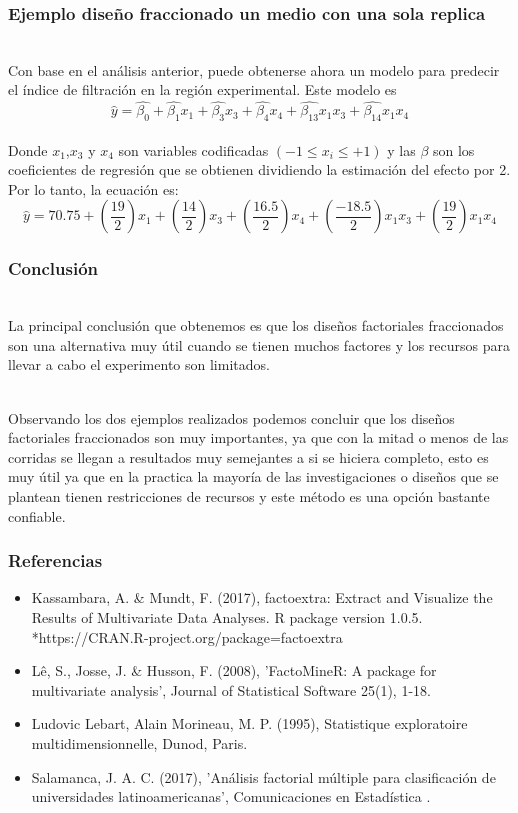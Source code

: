 \documentclass[12pt]{beamer}
\begin{document}
\begin{frame}
\frametitle{Ejemplo diseño fraccionado un medio con una sola replica}
~\\Con base en el análisis anterior, puede obtenerse ahora un modelo para predecir el índice de filtración en la región experimental. Este modelo es
$$\hat{y}=\hat{\beta_0}+\hat{\beta_1}x_1+\hat{\beta_3}x_3+\hat{\beta_4}x_4+\hat{\beta_{13}}x_1x_3+\hat{\beta_{14}}x_1x_4$$
~\\Donde $x_1$,$x_3$ y $x_4$ son variables codificadas $(-1\leq x_i\leq +1)$ y las $\beta$ son los coeficientes de regresión que se obtienen dividiendo la estimación del efecto por 2. Por lo tanto, la ecuación es:
$$\hat{y}=70.75+\left(\frac{19}{2}\right)x_1+\left(\frac{14}{2}\right)x_3+\left(\frac{16.5}{2}\right)x_4+\left(\frac{-18.5}{2}\right)x_1x_3+\left(\frac{19}{2}\right)x_1x_4$$

\end{frame}

\begin{frame}
\frametitle{Conclusión}
~\\La principal conclusión que obtenemos es que los diseños factoriales fraccionados son una alternativa muy útil cuando se tienen muchos factores y los recursos para llevar a cabo el experimento son limitados.

~\\ Observando los dos ejemplos realizados podemos concluir que los diseños factoriales fraccionados son muy importantes, ya que con la mitad o menos de las corridas se llegan a resultados muy semejantes a si se hiciera completo, esto es muy útil ya que en la practica la mayoría de las investigaciones o diseños que se plantean tienen restricciones de recursos y este método es una opción bastante confiable.


\end{frame}




\begin{frame}
\frametitle{Referencias}
\begin{itemize}
\item Kassambara, A. \& Mundt, F. (2017), factoextra: Extract and Visualize the Results of Multivariate
Data Analyses. R package version 1.0.5.
*https://CRAN.R-project.org/package=factoextra


\item Lê, S., Josse, J. \& Husson, F. (2008), 'FactoMineR: A package for multivariate analysis', Journal
of Statistical Software 25(1), 1-18.


\item Ludovic Lebart, Alain Morineau, M. P. (1995), Statistique exploratoire multidimensionnelle, Dunod,
Paris.

\item Salamanca, J. A. C. (2017), 'Análisis factorial múltiple para clasificación de universidades latinoamericanas', Comunicaciones en Estadística .
\end{itemize}
\end{frame}
\end{document}
